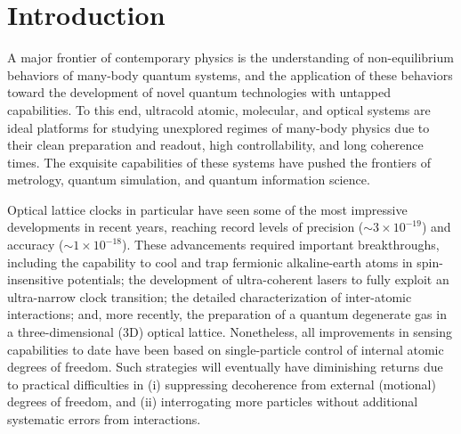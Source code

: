 \documentclass[aps,prx,superscriptaddress,notitlepage,twocolumn,longbibliography]{revtex4-1}
\begin{document}
\section{Introduction}

A major frontier of contemporary physics is the understanding of non-equilibrium behaviors of many-body quantum systems, and the application of these behaviors toward the development of novel quantum technologies with untapped capabilities\cite{eisert2015quantum}.
To this end, ultracold atomic, molecular, and optical systems are ideal platforms for studying unexplored regimes of many-body physics due to their clean preparation and readout, high controllability, and long coherence times\cite{bloch2008manybody, gross2017quantum}.
The exquisite capabilities of these systems have pushed the frontiers of metrology, quantum simulation, and quantum information science.

Optical lattice clocks in particular have seen some of the most impressive developments in recent years, reaching record levels of precision ($\sim 3\times 10^{-19}$)\cite{campbell2017fermidegenerate, marti2018imaging} and accuracy ($\sim 1\times 10^{-18}$)\cite{bloom2014optical, mcgrew2018atomic}.
These advancements required important breakthroughs, including the capability to cool and trap fermionic alkaline-earth atoms in spin-insensitive potentials\cite{takamoto2003spectroscopy, barber2006direct, ye2008quantum}; the development of ultra-coherent lasers\cite{kessler2012sub40mhzlinewidth, cole2013tenfold, matei2017mu} to fully exploit an ultra-narrow clock transition\cite{ludlow2015optical}; the detailed characterization of inter-atomic interactions\cite{scazza2014observation, cappellini2014direct, Zhang2014}; and, more recently, the preparation of a quantum degenerate gas in a three-dimensional (3D) optical lattice\cite{campbell2017fermidegenerate, marti2018imaging, goban2018emergence}.
Nonetheless, all improvements in sensing capabilities to date have been based on single-particle control of internal atomic degrees of freedom.
Such strategies will eventually have diminishing returns due to practical difficulties in (i) suppressing decoherence from external (motional) degrees of freedom, and (ii) interrogating more particles without additional systematic errors from interactions\cite{martin2013quantum, ludlow2015optical, marti2018imaging}.
\end{document}
